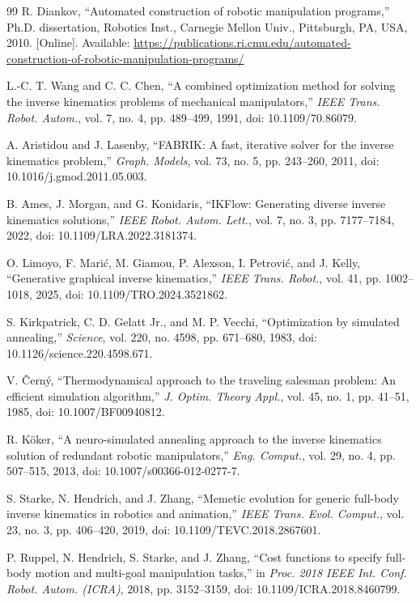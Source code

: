 \documentclass[10pt,conference]{IEEEtran}
\begin{document}
\begin{thebibliography}{99}
R. Diankov, ``Automated construction of robotic manipulation programs,''
Ph.D. dissertation, Robotics Inst., Carnegie Mellon Univ., Pittsburgh, PA, USA,
2010. [Online]. Available:
\url{https://publications.ri.cmu.edu/automated-construction-of-robotic-manipulation-programs/}

L.-C. T. Wang and C. C. Chen, ``A combined optimization method for solving the
inverse kinematics problems of mechanical manipulators,'' \emph{IEEE Trans.
Robot. Autom.}, vol. 7, no. 4, pp. 489--499, 1991, doi: 10.1109/70.86079.

A. Aristidou and J. Lasenby, ``FABRIK: A fast, iterative solver for the inverse
kinematics problem,'' \emph{Graph. Models}, vol. 73, no. 5, pp. 243--260, 2011,
doi: 10.1016/j.gmod.2011.05.003.

B. Ames, J. Morgan, and G. Konidaris, ``IKFlow: Generating diverse inverse
kinematics solutions,'' \emph{IEEE Robot. Autom. Lett.}, vol. 7, no. 3,
pp. 7177--7184, 2022, doi: 10.1109/LRA.2022.3181374.

O. Limoyo, F. Mari\'{c}, M. Giamou, P. Alexson, I. Petrovi\'{c}, and J. Kelly,
``Generative graphical inverse kinematics,'' \emph{IEEE Trans. Robot.}, vol. 41,
pp. 1002--1018, 2025, doi: 10.1109/TRO.2024.3521862.

S. Kirkpatrick, C. D. Gelatt Jr., and M. P. Vecchi, ``Optimization by simulated
annealing,'' \emph{Science}, vol. 220, no. 4598, pp. 671--680, 1983,
doi: 10.1126/science.220.4598.671.

V. \v{C}ern\'{y}, ``Thermodynamical approach to the traveling salesman problem:
An efficient simulation algorithm,'' \emph{J. Optim. Theory Appl.}, vol. 45,
no. 1, pp. 41--51, 1985, doi: 10.1007/BF00940812.

R. K\"{o}ker, ``A neuro-simulated annealing approach to the inverse kinematics
solution of redundant robotic manipulators,'' \emph{Eng. Comput.}, vol. 29,
no. 4, pp. 507--515, 2013, doi: 10.1007/s00366-012-0277-7.

S. Starke, N. Hendrich, and J. Zhang, ``Memetic evolution for generic full-body
inverse kinematics in robotics and animation,'' \emph{IEEE Trans. Evol. Comput.},
vol. 23, no. 3, pp. 406--420, 2019, doi: 10.1109/TEVC.2018.2867601.

P. Ruppel, N. Hendrich, S. Starke, and J. Zhang, ``Cost functions to specify
full-body motion and multi-goal manipulation tasks,'' in \emph{Proc. 2018 IEEE
Int. Conf. Robot. Autom. (ICRA)}, 2018, pp. 3152--3159,
doi: 10.1109/ICRA.2018.8460799.


\end{thebibliography}
\end{document}
